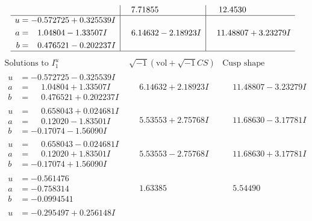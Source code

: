 \documentclass[1p]{elsarticle_modified}
\theoremstyle{definition}
\newcommand{\I}{\sqrt{-1}}
\begin{document}
$$\begin{array}{c|c|c}
 & \phantom{-}7.71855\phantom{ +0.000000I} & \phantom{-}12.4530\phantom{ +0.000000I} \\ \hline\begin{aligned}
u &= -0.572725 + 0.325539 I \\
a &= \phantom{-}1.04804 - 1.33507 I \\
b &= \phantom{-}0.476521 - 0.202237 I\end{aligned}
 & \phantom{-}6.14632 - 2.18923 I & \phantom{-}11.48807 + 3.23279 I\\
 \hline 
 \end{array}$$\newpage$$\begin{array}{c|c|c}  
\text{Solutions to }I^u_{1}& \I (\text{vol} + \sqrt{-1}CS) & \text{Cusp shape}\\
 \hline 
\begin{aligned}
u &= -0.572725 - 0.325539 I \\
a &= \phantom{-}1.04804 + 1.33507 I \\
b &= \phantom{-}0.476521 + 0.202237 I\end{aligned}
 & \phantom{-}6.14632 + 2.18923 I & \phantom{-}11.48807 - 3.23279 I \\ \hline\begin{aligned}
u &= \phantom{-}0.658043 + 0.024681 I \\
a &= \phantom{-}0.12020 - 1.83501 I \\
b &= -0.17074 - 1.56090 I\end{aligned}
 & \phantom{-}5.53553 + 2.75768 I & \phantom{-}11.68630 - 3.17781 I \\ \hline\begin{aligned}
u &= \phantom{-}0.658043 - 0.024681 I \\
a &= \phantom{-}0.12020 + 1.83501 I \\
b &= -0.17074 + 1.56090 I\end{aligned}
 & \phantom{-}5.53553 - 2.75768 I & \phantom{-}11.68630 + 3.17781 I \\ \hline\begin{aligned}
u &= -0.561476\phantom{ +0.000000I} \\
a &= -0.758314\phantom{ +0.000000I} \\
b &= -0.0994541\phantom{ +0.000000I}\end{aligned}
 & \phantom{-}1.63385\phantom{ +0.000000I} & \phantom{-}5.54490\phantom{ +0.000000I} \\ \hline\begin{aligned}
u &= -0.295497 + 0.256148 I \\

\end{aligned}
\end{array}$$
\end{document}
